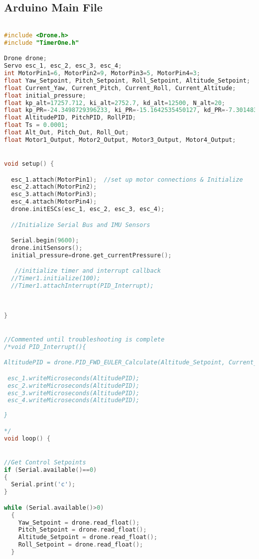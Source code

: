 \subsection{Arduino Main File}
\lstset{basicstyle=\tiny}
\begin{lstlisting}[language=C,caption={Main.ino Drone Flight Program},label={lst:main.ino}]

#include <Drone.h>
#include "TimerOne.h"

Drone drone;
Servo esc_1, esc_2, esc_3, esc_4;
int MotorPin1=6, MotorPin2=9, MotorPin3=5, MotorPin4=3;
float Yaw_Setpoint, Pitch_Setpoint, Roll_Setpoint, Altitude_Setpoint;
float Current_Yaw, Current_Pitch, Current_Roll, Current_Altitude;
float initial_pressure;
float kp_alt=17257.712, ki_alt=2752.7, kd_alt=12500, N_alt=20;
float kp_PR=-24.3498729396233, ki_PR=-15.1642535450127, kd_PR=-7.30148358076729, N_PR=44.9852981416911;
float AltitudePID, PitchPID, RollPID;
float Ts = 0.0001;
float Alt_Out, Pitch_Out, Roll_Out;
float Motor1_Output, Motor2_Output, Motor3_Output, Motor4_Output;


void setup() {

  esc_1.attach(MotorPin1);  //set up motor connections & Initialize
  esc_2.attach(MotorPin2);
  esc_3.attach(MotorPin3);
  esc_4.attach(MotorPin4);
  drone.initESCs(esc_1, esc_2, esc_3, esc_4);

  //Initialize Serial Bus and IMU Sensors

  Serial.begin(9600);
  drone.initSensors();
  initial_pressure=drone.get_currentPressure();

   //initialize timer and interrupt callback
  //Timer1.initialize(100);                      
  //Timer1.attachInterrupt(PID_Interrupt);
   
   
  
}


//Commented until troubleshooting is complete
/*void PID_Interrupt(){

AltitudePID = drone.PID_FWD_EULER_Calculate(Altitude_Setpoint, Current_Altitude, kp, kd, ki, Ts);

 esc_1.writeMicroseconds(AltitudePID);
 esc_2.writeMicroseconds(AltitudePID);
 esc_3.writeMicroseconds(AltitudePID);
 esc_4.writeMicroseconds(AltitudePID);
  
}

*/
void loop() {


//Get Control Setpoints
if (Serial.available()==0)
{
  Serial.print('c');
}

while (Serial.available()>0)
  {
    Yaw_Setpoint = drone.read_float();
    Pitch_Setpoint = drone.read_float();
    Altitude_Setpoint = drone.read_float();
    Roll_Setpoint = drone.read_float(); 
  }
  

\end{lstlisting}

